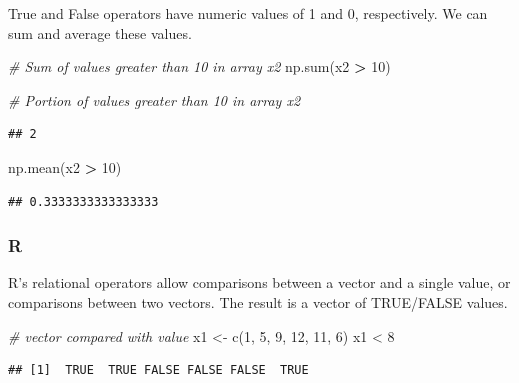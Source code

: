 \documentclass[
]{book}
\newenvironment{Shaded}{\begin{snugshade}}{\end{snugshade}}
\newcommand{\BuiltInTok}[1]{#1}
\newcommand{\CommentTok}[1]{\textcolor[rgb]{0.56,0.35,0.01}{\textit{#1}}}
\newcommand{\DecValTok}[1]{\textcolor[rgb]{0.00,0.00,0.81}{#1}}
\newcommand{\FunctionTok}[1]{\textcolor[rgb]{0.00,0.00,0.00}{#1}}
\newcommand{\NormalTok}[1]{#1}
\newcommand{\OperatorTok}[1]{\textcolor[rgb]{0.81,0.36,0.00}{\textbf{#1}}}
\newcommand{\OtherTok}[1]{\textcolor[rgb]{0.56,0.35,0.01}{#1}}
\newcommand{\SpecialCharTok}[1]{\textcolor[rgb]{0.00,0.00,0.00}{#1}}
\begin{document}
True and False operators have numeric values of 1 and 0, respectively. We can sum and average these values.

\begin{Shaded}
\begin{Highlighting}[]
\CommentTok{\# Sum of values greater than 10 in array x2}
\NormalTok{np.}\BuiltInTok{sum}\NormalTok{(x2 }\OperatorTok{\textgreater{}} \DecValTok{10}\NormalTok{)}

\CommentTok{\# Portion of values greater than 10 in array x2}
\end{Highlighting}
\end{Shaded}

\begin{verbatim}
## 2
\end{verbatim}

\begin{Shaded}
\begin{Highlighting}[]
\NormalTok{np.mean(x2 }\OperatorTok{\textgreater{}} \DecValTok{10}\NormalTok{)}
\end{Highlighting}
\end{Shaded}

\begin{verbatim}
## 0.3333333333333333
\end{verbatim}

\hypertarget{r-4}{%
\subsubsection*{R}\label{r-4}}

R's relational operators allow comparisons between a vector and a single value, or comparisons between two vectors. The result is a vector of TRUE/FALSE values.

\begin{Shaded}
\begin{Highlighting}[]
\CommentTok{\# vector compared with value}
\NormalTok{x1 }\OtherTok{\textless{}{-}} \FunctionTok{c}\NormalTok{(}\DecValTok{1}\NormalTok{, }\DecValTok{5}\NormalTok{, }\DecValTok{9}\NormalTok{, }\DecValTok{12}\NormalTok{, }\DecValTok{11}\NormalTok{, }\DecValTok{6}\NormalTok{)}
\NormalTok{x1 }\SpecialCharTok{\textless{}} \DecValTok{8}
\end{Highlighting}
\end{Shaded}

\begin{verbatim}
## [1]  TRUE  TRUE FALSE FALSE FALSE  TRUE
\end{verbatim}
\end{document}

